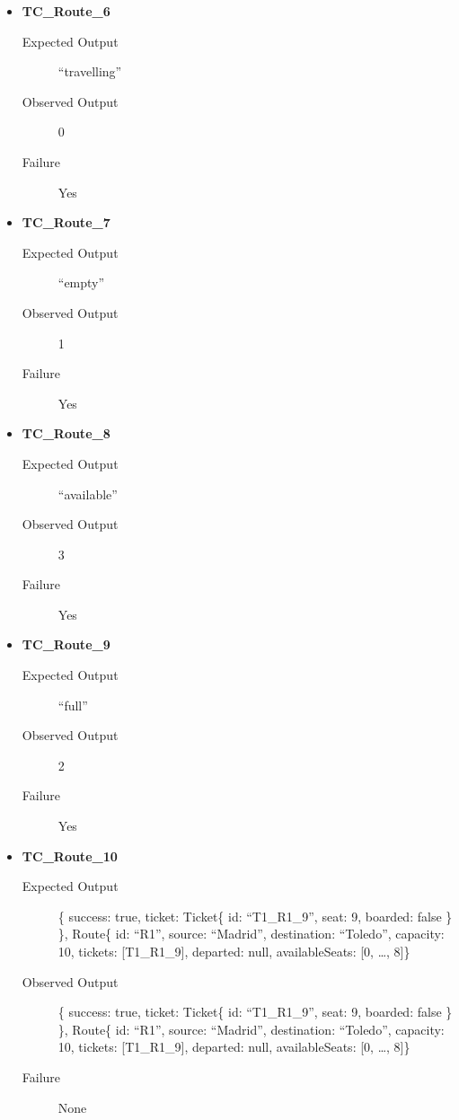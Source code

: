 \documentclass[11pt]{article}
\begin{document}
\begin{itemize}
\item \textbf{TC\_Route\_6}
\begin{description}
\item[{Expected Output}] “travelling”
\item[{Observed Output}] 0
\item[{Failure}] Yes
\end{description}

\item \textbf{TC\_Route\_7}
\begin{description}
\item[{Expected Output}] “empty”
\item[{Observed Output}] 1
\item[{Failure}] Yes
\end{description}

\item \textbf{TC\_Route\_8}
\begin{description}
\item[{Expected Output}] “available”
\item[{Observed Output}] 3
\item[{Failure}] Yes
\end{description}

\item \textbf{TC\_Route\_9}
\begin{description}
\item[{Expected Output}] “full”
\item[{Observed Output}] 2
\item[{Failure}] Yes
\end{description}

\item \textbf{TC\_Route\_10}
\begin{description}
\item[{Expected Output}] \{ success: true, ticket:  Ticket\{ id: “T1\_R1\_9”, seat: 9, boarded: false \} \},
Route\{ id: “R1”, source: “Madrid”, destination: “Toledo”, capacity: 10,  tickets: [T1\_R1\_9], departed: null, availableSeats: [0, …, 8]\}
\item[{Observed Output}] \{ success: true, ticket:  Ticket\{ id: “T1\_R1\_9”, seat: 9, boarded: false \} \},
Route\{ id: “R1”, source: “Madrid”, destination: “Toledo”, capacity: 10,  tickets: [T1\_R1\_9], departed: null, availableSeats: [0, …, 8]\}
\item[{Failure}] None
\end{description}


\end{itemize}
\end{document}
